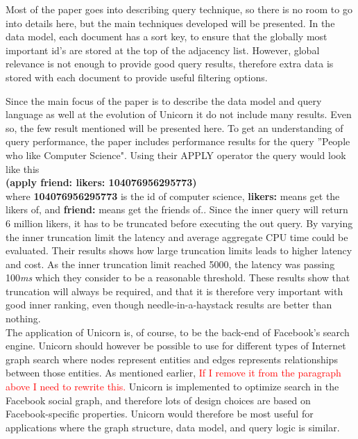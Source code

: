 \documentclass{article}
\begin{document}
\noindent Most of the paper goes into describing query technique, so there is no room to go into details here, but the main techniques developed will be presented. In the data model, each document has a sort key, to ensure that the globally most important id's are stored at the top of the adjacency list. However, global relevance is not enough to provide good query results, therefore extra data is stored with each document to provide useful filtering options. 

\noindent Since the main focus of the paper is to describe the data model and query language as well at the evolution of Unicorn it do not include many results. Even so, the few result mentioned will be presented here. To get an understanding of query performance, the paper includes performance results for the query ''People who like Computer Science". Using their APPLY operator the query would look like this\\

\noindent \textbf{(apply friend: likers: 104076956295773)}\\

where \textbf{104076956295773} is the id of computer science, \textbf{likers:} means get the likers of, and \textbf{friend:} means get the friends of.. Since the inner query will return 6 million likers, it has to be truncated before executing the out query. By varying the inner truncation limit the latency and average aggregate CPU time could be evaluated. Their results shows how large truncation limits leads to higher latency and cost. As the inner truncation limit reached 5000, the latency was passing 100\textit{ms} which they consider to be a reasonable threshold. These results show that truncation will always be required, and that it is therefore very important with good inner ranking, even though needle-in-a-haystack results are better than nothing. \\

\noindent The application of Unicorn is, of course, to be the back-end of Facebook's search engine. Unicorn should however be possible to use for different types of Internet graph search where nodes represent entities and edges represents relationships between those entities. As mentioned earlier, \textcolor{red}{If I remove it from the paragraph above I need to rewrite this.} Unicorn is implemented to optimize search in the Facebook social graph, and therefore lots of design choices are based on Facebook-specific properties. Unicorn would therefore be most useful for applications where the graph structure, data model, and query logic is similar. \\
\end{document}

